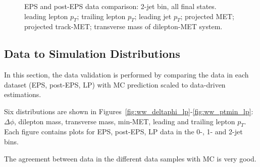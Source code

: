 \begin{figure}[!hbtp]
\caption{EPS and post-EPS data comparison: 2-jet bin, all final states. 
 leading lepton $p_T$;
 trailing lepton $p_T$;
 leading jet $p_T$;
 projected MET;
 projected track-MET;
 transverse mass of dilepton-MET system.
}
\label{fig:lp_ww2j_lepjetmet}
\end{figure}

\clearpage

\subsection{Data to Simulation Distributions}

In this section, the data validation is performed by comparing the data in each dataset (EPS, post-EPS, LP) with MC prediction scaled to 
data-driven estimations.

Six distributions are shown in Figures~\ref{fig:ww_deltaphi_lp}-\ref{fig:ww_ptmin_lp}: $\Delta\phi$, dilepton mass, transverse mass, 
min-MET, leading and trailing lepton $p_T$. Each figure contains plots for EPS, post-EPS, LP data in the 0-, 1- and 2-jet bins.

The agreement between data in the different data samples with MC is very good.

